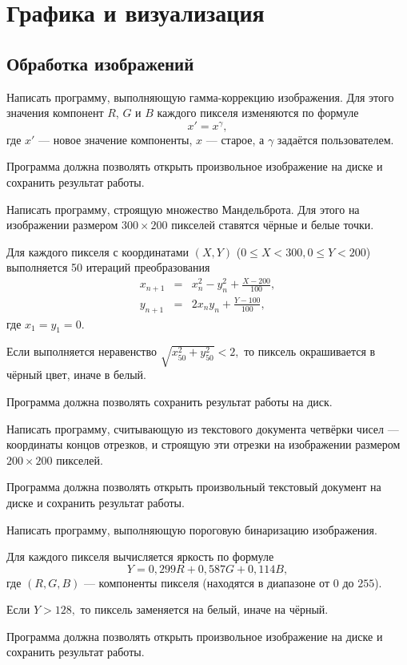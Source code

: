 \section{Графика и визуализация}

\subsection{Обработка изображений}

\task Написать программу, выполняющую гамма-коррекцию изображения. Для
этого значения компонент $R$, $G$ и $B$ каждого пикселя изменяются по
формуле
\[
x'=x^{\gamma},
\]
где $x'$ — новое значение компоненты, $x$ — старое, а $\gamma$
задаётся пользователем.

Программа должна позволять открыть произвольное изображение на диске и
сохранить результат работы.

\task Написать программу, строящую множество Мандельброта. Для этого
на изображении размером $300 \times 200$ пикселей ставятся чёрные и
белые точки.

Для каждого пикселя с координатами $(X, Y)$
($0\leqslant X < 300, 0\leqslant Y < 200$) выполняется 50 итераций
преобразования
\begin{eqnarray*}
x_{n+1} &=& x_n^2 - y_n^2 + \frac{X - 200}{100},\\
y_{n+1} &=& 2 x_n y_n + \frac{Y-100}{100},
\end{eqnarray*}
где $x_1=y_1=0.$

Если выполняется неравенство $\sqrt{x_{50}^2 + y_{50}^2} < 2,$ то
пиксель окрашивается в чёрный цвет, иначе в белый.

Программа должна позволять сохранить результат работы на диск.

\task Написать программу, считывающую из текстового документа четвёрки
чисел — координаты концов отрезков, и строящую эти отрезки на изображении
размером $200\times 200$ пикселей.

Программа должна позволять открыть произвольный текстовый документ на
диске и сохранить результат работы.

\task Написать программу, выполняющую пороговую бинаризацию
изображения.

Для каждого пикселя вычисляется яркость по формуле
\[
Y = 0{,}299 R + 0{,}587 G + 0{,}114 B,
\]
где $(R, G, B)$ — компоненты пикселя (находятся в диапазоне от $0$ до
$255$).

Если $Y > 128,$ то пиксель заменяется на белый, иначе на чёрный.

Программа должна позволять открыть произвольное изображение на диске и
сохранить результат работы.

